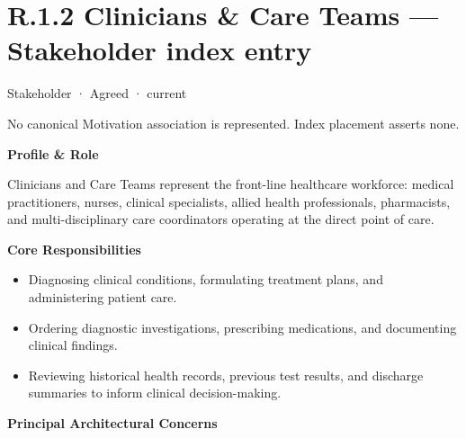 \section*{R.1.2 Clinicians \& Care Teams — Stakeholder index entry}
\label{navigation:R.1.2}

\label{element:37264af5adb64b37b7537e3d48b6747b}
{\small Stakeholder · Agreed · current}\par
No canonical Motivation association is represented. Index placement asserts none.\par

\par\medskip\textbf{Profile \& Role}\par


Clinicians and Care Teams represent the front-line healthcare workforce: medical practitioners, nurses, clinical specialists, allied health professionals, pharmacists, and multi-disciplinary care coordinators operating at the direct point of care.



\par\medskip\textbf{Core Responsibilities}\par


\begin{itemize}


\item Diagnosing clinical conditions, formulating treatment plans, and administering patient care.

\item Ordering diagnostic investigations, prescribing medications, and documenting clinical findings.

\item Reviewing historical health records, previous test results, and discharge summaries to inform clinical decision-making.

\end{itemize}


\par\medskip\textbf{Principal Architectural Concerns}\par


